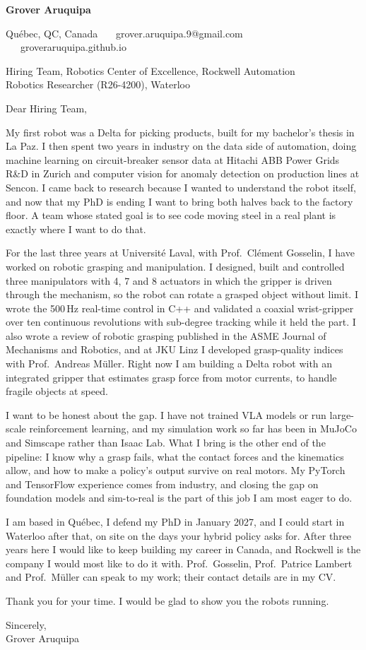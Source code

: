 \documentclass[11pt,letterpaper]{article}
\begin{document}
{\large\bfseries Grover Aruquipa}\par\vspace{-6pt}
{\small Qu\'ebec, QC, Canada \ \textbullet\ \ grover.aruquipa.9@gmail.com \ \textbullet\ \ groveraruquipa.github.io}

\vspace{6pt}
Hiring Team, Robotics Center of Excellence, Rockwell Automation\\
Robotics Researcher (R26-4200), Waterloo

Dear Hiring Team,

My first robot was a Delta for picking products, built for my bachelor's thesis in La Paz. I then spent two years in industry on the data side of automation, doing machine learning on circuit-breaker sensor data at Hitachi ABB Power Grids R\&D in Zurich and computer vision for anomaly detection on production lines at Sencon. I came back to research because I wanted to understand the robot itself, and now that my PhD is ending I want to bring both halves back to the factory floor. A team whose stated goal is to see code moving steel in a real plant is exactly where I want to do that.

For the last three years at Universit\'e Laval, with Prof.\ Cl\'ement Gosselin, I have worked on robotic grasping and manipulation. I designed, built and controlled three manipulators with 4, 7 and 8 actuators in which the gripper is driven through the mechanism, so the robot can rotate a grasped object without limit. I wrote the 500\,Hz real-time control in C++ and validated a coaxial wrist-gripper over ten continuous revolutions with sub-degree tracking while it held the part. I also wrote a review of robotic grasping published in the ASME Journal of Mechanisms and Robotics, and at JKU Linz I developed grasp-quality indices with Prof.\ Andreas M\"uller. Right now I am building a Delta robot with an integrated gripper that estimates grasp force from motor currents, to handle fragile objects at speed.

I want to be honest about the gap. I have not trained VLA models or run large-scale reinforcement learning, and my simulation work so far has been in MuJoCo and Simscape rather than Isaac Lab. What I bring is the other end of the pipeline: I know why a grasp fails, what the contact forces and the kinematics allow, and how to make a policy's output survive on real motors. My PyTorch and TensorFlow experience comes from industry, and closing the gap on foundation models and sim-to-real is the part of this job I am most eager to do.

I am based in Qu\'ebec, I defend my PhD in January 2027, and I could start in Waterloo after that, on site on the days your hybrid policy asks for. After three years here I would like to keep building my career in Canada, and Rockwell is the company I would most like to do it with. Prof.\ Gosselin, Prof.\ Patrice Lambert and Prof.\ M\"uller can speak to my work; their contact details are in my CV.

Thank you for your time. I would be glad to show you the robots running.

Sincerely,\\
Grover Aruquipa
\end{document}
